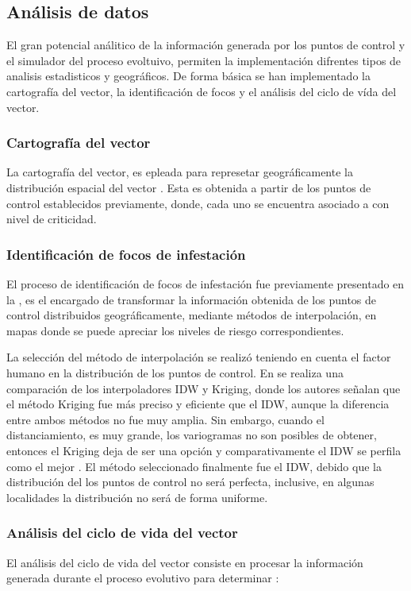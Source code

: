 \subsection{Análisis de datos}
El gran potencial análitico de la información generada por los puntos de control y el simulador
del proceso evoltuivo, permiten la implementación difrentes tipos de analisis estadisticos y
geográficos. De forma básica se han implementado la cartografía del vector, la identificación de
focos y el análisis del ciclo de vída del vector.

\subsubsection{Cartografía del vector}
La cartografía del vector, es epleada para represetar geográficamente la distribución espacial
del vector \citep{vgomesAegis2001}. Esta es obtenida a partir de los puntos de control establecidos
previamente, donde, cada uno se encuentra asociado a con nivel de criticidad.


\subsubsection{Identificación de focos de infestación}
\label{sec:cap5-identificacion-focos}
El proceso de identificación de focos de infestación fue previamente presentado en la
, es el encargado de transformar la información obtenida de
los puntos de control distribuidos geográficamente, mediante métodos de interpolación, en mapas
donde se puede apreciar los niveles de riesgo correspondientes.

La selección del método de interpolación se realizó teniendo en cuenta el factor humano en la
distribución de los puntos de control. En \citet{villatoro2007comparacion} se realiza una
comparación de los interpoladores IDW y Kriging, donde los autores señalan que el método Kriging
fue más preciso y eficiente que el IDW, aunque la diferencia entre ambos métodos no fue muy amplia.
Sin embargo, cuando el distanciamiento, es muy grande, los variogramas no son posibles
de obtener, entonces el Kriging deja de ser una opción y comparativamente el IDW se perfila como
el mejor \citep{villatoro2007comparacion}. El método seleccionado finalmente fue el IDW, debido
que la distribución del los puntos de control no será perfecta, inclusive, en algunas localidades
la distribución no será de forma uniforme.

\subsubsection{Análisis del ciclo de vida del vector}
El análisis del ciclo de vida del vector consiste en procesar la información generada durante el
proceso evolutivo para determinar :

